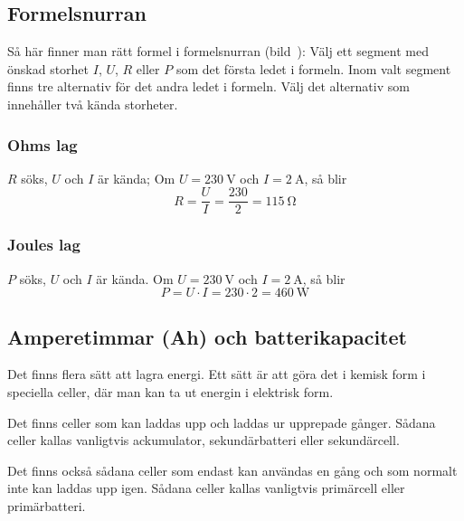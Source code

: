 \pagebreak[3]

\subsection{Formelsnurran}


Så här finner man rätt formel i formelsnurran (bild~):
Välj ett segment med önskad storhet \(I\), \(U\), \(R\) eller \(P\) som det
första ledet i formeln.
Inom valt segment finns tre alternativ för det andra ledet i formeln.
Välj det alternativ som innehåller två kända storheter.

\subsubsection{Ohms lag}

\(R\) söks, \(U\) och \(I\) är kända;
Om \(U = \qty{230}{\volt}\) och \(I = \qty{2}{\ampere}\), så blir
\[R=\dfrac{U}{I}=\dfrac{230}{2}=\qty{115}{\ohm}\]
\subsubsection{Joules lag}

\(P\) söks, \(U\) och \(I\) är kända.
Om \(U = \qty{230}{\volt}\) och \(I = \qty{2}{\ampere}\), så blir
\[P = U \cdot I = 230 \cdot 2 = \qty{460}{\watt}\]
\subsection{Amperetimmar (Ah) och batterikapacitet}
\label{batterikapacitet}

Det finns flera sätt att lagra energi.
Ett sätt är att göra det i kemisk form i speciella celler, där man kan ta ut
energin i elektrisk form.

Det finns celler som kan laddas upp och laddas ur upprepade gånger.
Sådana celler kallas vanligtvis ackumulator, sekundärbatteri eller
sekundärcell.

Det finns också sådana celler som endast kan användas en gång och som normalt
inte kan laddas upp igen.
Sådana celler kallas vanligtvis primärcell eller primärbatteri.

